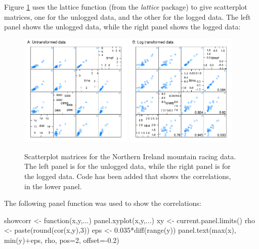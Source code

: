 Figure \ref{fig:nimra} uses the lattice function
 (from the {\em lattice} package) to give scatterplot
matrices, one for the unlogged data, and the other for the logged
data.  The left panel shows the unlogged data, while the right panel
shows the logged data:
\begin{figure}
\vspace*{-6pt}
\begin{Schunk}


\centerline{\includegraphics[width=0.48\textwidth]{figs/03-nihills-spmAB-1} \includegraphics[width=0.48\textwidth]{figs/03-nihills-spmAB-2} }

\end{Schunk}
\caption{Scatterplot matrices for the Northern Ireland mountain racing
  data. The left panel is for the unlogged data, while the right panel is
for the logged data.  Code has been added that shows the correlations,
in the lower panel.\label{fig:nimra}}
\end{figure}
\vspace*{15pt}

The following panel function was used to show the correlations:
\begin{Schunk}
\begin{Sinput}
showcorr <- function(x,y,...){
    panel.xyplot(x,y,...)
    xy <- current.panel.limits()
    rho <- paste(round(cor(x,y),3))
    eps <- 0.035*diff(range(y))
    panel.text(max(x), min(y)+eps, rho,
               pos=2, offset=-0.2)
}
\end{Sinput}
\end{Schunk}

